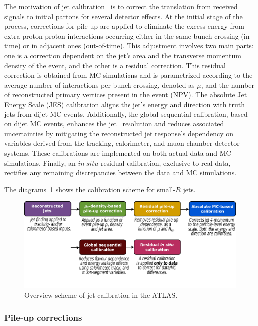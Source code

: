 The motivation of jet calibration~\cite{ATLAS:2020cli,PhysRevD.96.072002} is to correct the translation from received signals to initial partons for several detector effects. At the initial stage of the process, corrections for pile-up are applied to eliminate the excess energy from extra proton-proton interactions occurring either in the same bunch crossing (in-time) or in adjacent ones (out-of-time). This adjustment involves two main parts: one is a correction dependent on the jet’s area and the transverse momentum density of the event, and the other is a residual correction. This residual correction is obtained from MC simulations and is parametrized according to the average number of interactions per bunch crossing, denoted as $\mu$, and the number of reconstructed primary vertices present in the event (NPV).  The absolute Jet Energy Scale (JES) calibration aligns the jet's energy and direction with truth jets from dijet MC events. Additionally, the global sequential calibration, based on dijet MC events, enhances the jet \pt~resolution and reduces associated uncertainties by mitigating the reconstructed jet response's dependency on variables derived from the tracking, calorimeter, and muon chamber detector systems. These calibrations are implemented on both actual data and MC simulations. Finally, an $in~situ$ residual calibration, exclusive to real data, rectifies any remaining discrepancies between the data and MC simulations.

The diagrams~\ref{Fig.calib} shows the calibration scheme for small-$R$ jets.

\begin{figure}[htb] 
	\centering  
	\includegraphics[width=15cm]{./fig/calib.png}	\caption{Overview scheme of jet calibration in the ATLAS.}
	\label{Fig.calib}
\end{figure}

\subsubsection{Pile-up corrections}


